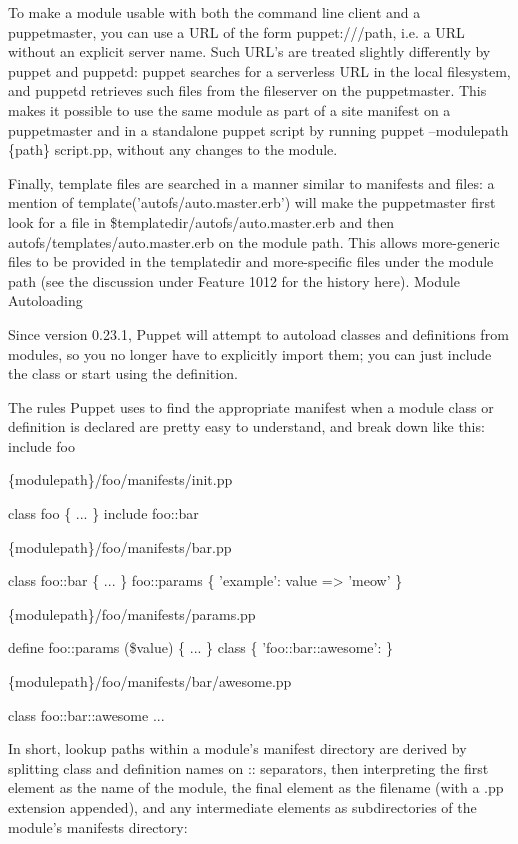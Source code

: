 To make a module usable with both the command line client and a puppetmaster, you can use a URL of the form puppet:///path, i.e. a URL without an explicit server name. Such URL's are treated slightly differently by puppet and puppetd: puppet searches for a serverless URL in the local filesystem, and puppetd retrieves such files from the fileserver on the puppetmaster. This makes it possible to use the same module as part of a site manifest on a puppetmaster and in a standalone puppet script by running puppet --modulepath \{path\} script.pp, without any changes to the module.

Finally, template files are searched in a manner similar to manifests and files: a mention of template('autofs/auto.master.erb') will make the puppetmaster first look for a file in \$templatedir/autofs/auto.master.erb and then autofs/templates/auto.master.erb on the module path. This allows more-generic files to be provided in the templatedir and more-specific files under the module path (see the discussion under Feature 1012 for the history here).
Module Autoloading

Since version 0.23.1, Puppet will attempt to autoload classes and definitions from modules, so you no longer have to explicitly import them; you can just include the class or start using the definition.

The rules Puppet uses to find the appropriate manifest when a module class or definition is declared are pretty easy to understand, and break down like this:
include foo 	

\{modulepath\}/foo/manifests/init.pp

class foo \{ ... \}
include foo::bar 	

\{modulepath\}/foo/manifests/bar.pp

class foo::bar \{ ... \}
foo::params \{ 'example': value => 'meow' \} 	

\{modulepath\}/foo/manifests/params.pp

define foo::params (\$value) \{ ... \}
class \{ 'foo::bar::awesome': \} 	

\{modulepath\}/foo/manifests/bar/awesome.pp

class foo::bar::awesome { ... }

In short, lookup paths within a module's manifest directory are derived by splitting class and definition names on :: separators, then interpreting the first element as the name of the module, the final element as the filename (with a .pp extension appended), and any intermediate elements as subdirectories of the module's manifests directory:

